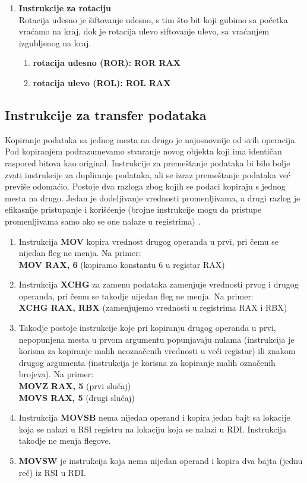 \documentclass[a4paper]{article}
\begin{document}
\begin{enumerate}
\item{\textbf{Instrukcije za rotaciju}} \\
Rotacija udesno je \v siftovanje udesno, s tim \v sto bit koji gubimo sa po\v cetka vra\' camo na kraj, dok je rotacija
ulevo siftovanje ulevo, sa vra\' canjem izgubljenog na kraj.
\begin{enumerate}
\item {\textbf{rotacija udesno (ROR): ROR RAX}}
\item {\textbf{rotacija ulevo (ROL): ROL RAX}}
\end {enumerate}
\end{enumerate}

\subsection{\textbf{Instrukcije za transfer podataka}}
Kopiranje podataka sa jednog mesta na drugo je najosnovnije od svih operacija. Pod kopiranjem podrazumevamo stvaranje novog objekta koji ima 
identi\v can raspored bitova kao original. Instrukcije za preme\v stanje podataka bi bilo bolje zvati instrukcije za dupliranje podataka, ali
se izraz preme\v stanje podataka ve\' c previ\v se odoma\' cio. Postoje dva razloga zbog kojih se podaci kopiraju s jednog mesta na drugo. Jedan je 
dodeljivanje vrednosti promenljivama, a drugi razlog je efikasnije pristupanje i kori\v s\' cenje (brojne instrukcije mogu da pristupe
promenljivama samo ako se one nalaze u registrima) \cite{x86Assembly}. \\ 
\begin{enumerate}
\item{Instrukcija \textbf {MOV} kopira vrednost drugog operanda u prvi, pri \v cemu se nijedan fleg ne menja. Na primer:} \\
\textbf{MOV RAX, 6} (kopiramo konstantu 6 u registar RAX)
\item{Instrukcija \textbf {XCHG} za zamenu podataka zamenjuje vrednosti prvog i drugog operanda, pri \v cemu se takodje nijedan fleg ne menja. Na primer:} \\
\textbf{XCHG RAX, RBX} (zamenjujemo vrednosti u registrima RAX i RBX) 
\item{Takodje postoje instrukcije koje pri kopiranju drugog operanda u prvi, nepopunjena mesta u prvom argumentu popunjavaju nulama (instrukcija
je korisna za kopiranje malih neozna\v cenih vrednosti u ve\' ci registar) ili znakom drugog argumenta (instrukcija je korisna za kopiranje malih 
ozna\v cenih brojeva)}. Na primer:\\ 
\textbf{MOVZ RAX, 5} (prvi slu\v caj)\\
\textbf{MOVS RAX, 5} (drugi slu\v caj)
\item{Instrukcija \textbf{MOVSB} nema nijedan operand i kopira jedan bajt sa lokacije koja se nalazi u RSI registru na lokaciju koja se nalazi u RDI. Instrukcija
takodje ne menja flegove.}
\item{\textbf{MOVSW} je instrukcija koja nema nijedan operand i kopira dva bajta (jednu re\v c) iz RSI u RDI.}
\end{enumerate}
\end{document}
